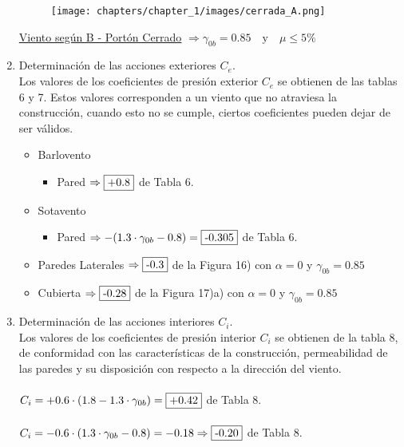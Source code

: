 \begin{enumerate}
\newpage
\begin{figure}[H]
\begin{center}
     \texttt{[image: chapters/chapter\_1/images/cerrada\_A.png]}
\end{center}
\end{figure}
\newpage


\underline{Viento según B - Portón Cerrado} $\Rightarrow \gamma_{0b}=0.85 \quad \text{y} \quad \mu \leq 5\%$\\

\item Determinación de las acciones exteriores $C_e$.\\
Los valores de los coeficientes de presión exterior $C_e$ se obtienen de las tablas 6 y 7. Estos valores corresponden a un viento que no atraviesa la construcción, cuando esto no se cumple, ciertos coeficientes pueden dejar de ser válidos.\\
\begin{itemize}
	\item Barlovento	
		\begin{itemize}
		\item Pared $\Rightarrow \framebox{+0.8} $ de Tabla 6.
		\end{itemize}
	\item Sotavento
		\begin{itemize}
		\item Pared $\Rightarrow -(1.3 \cdot \gamma_{0b}-0.8) = \framebox{-0.305}$ de Tabla 6.
		\end{itemize}
	\item Paredes Laterales $\Rightarrow \framebox{-0.3} $ de la Figura 16) con $\alpha = 0 $ y $\gamma_{0b}=0.85$
    \item Cubierta $\Rightarrow \framebox{-0.28} $ de la Figura 17)a) con $\alpha = 0 $ y $\gamma_{0b}=0.85$
\end{itemize}

\item Determinación de las acciones interiores $C_i$.\\
Los valores de los coeficientes de presión interior $C_i$ se obtienen de la tabla 8, de conformidad con las características de la construcción, permeabilidad de las paredes y su disposición con respecto a la dirección del viento.\\
\\
$ C_i = + 0.6 \cdot (1.8 -1.3 \cdot \gamma_{0b}) = \framebox{+0.42} $ de Tabla 8.\\
\\
$ C_i = - 0.6 \cdot (1.3 \cdot \gamma_{0b} - 0.8) = -0.18 \Rightarrow \framebox{-0.20} $ de Tabla 8.\\


\end{enumerate}
